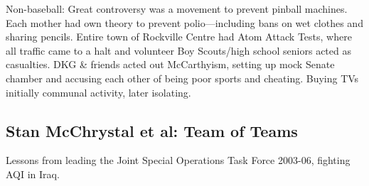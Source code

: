 \documentclass[
]{article}
\begin{document}
Non-baseball: Great controversy was a movement to prevent pinball
machines. Each mother had own theory to prevent polio---including bans
on wet clothes and sharing pencils. Entire town of Rockville Centre had
Atom Attack Tests, where all traffic came to a halt and volunteer Boy
Scouts/high school seniors acted as casualties. DKG \& friends acted out
McCarthyism, setting up mock Senate chamber and accusing each other of
being poor sports and cheating. Buying TVs initially communal activity,
later isolating.

\hypertarget{stan-mcchrystal-et-al-team-of-teams}{%
\subsection{Stan McChrystal et al: Team of
Teams}\label{stan-mcchrystal-et-al-team-of-teams}}

Lessons from leading the Joint Special Operations Task Force 2003-06,
fighting AQI in Iraq.
\end{document}
